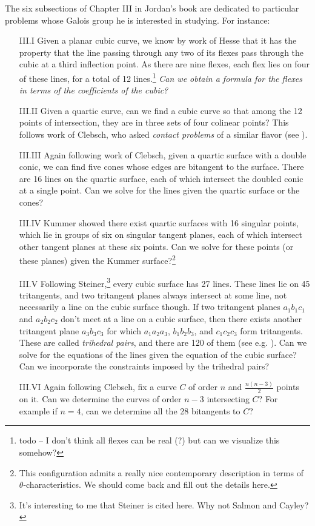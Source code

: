 \documentclass[11pt]{amsart}
\begin{document}
The six subsections of Chapter III in Jordan's book are dedicated to particular problems whose Galois group he is interested in studying. For instance:
\begin{itemize}
    \item[III.I] Given a planar cubic curve, we know by work of Hesse that it has the property that the line passing through any two of its flexes pass through the cubic at a third inflection point. As there are nine flexes, each flex lies on four of these lines, for a total of 12 lines.\footnote{todo -- I don't think all flexes can be real (?) but can we visualize this somehow?} \emph{Can we obtain a formula for the flexes in terms of the coefficients of the cubic?}

    \item[III.II] Given a quartic curve, can we find a cubic curve so that among the 12 points of intersection, they are in three sets of four colinear points? This follows work of Clebsch, who asked \textit{contact problems} of a similar flavor (see \cite[(429)]{Jordan}).

    \item[III.III] Again following work of Clebsch, given a quartic surface with a double conic, we can find five cones whose edges are bitangent to the surface. There are 16 lines on the quartic surface, each of which intersect the doubled conic at a single point. Can we solve for the lines given the quartic surface or the cones?
    
    \item[III.IV] Kummer showed there exist quartic surfaces with 16 singular points, which lie in groups of six on singular tangent planes, each of which intersect other tangent planes at these six points. Can we solve for these points (or these planes) given the Kummer surface?\footnote{This configuration admits a really nice contemporary description in terms of $\theta$-characteristics. We should come back and fill out the details here.}

    \item[III.V] Following Steiner,\footnote{It's interesting to me that Steiner is cited here. Why not Salmon and Cayley?} every cubic surface has 27 lines. These lines lie on 45 tritangents, and two tritangent planes always intersect at some line, not necessarily a line on the cubic surface though. If two tritangent planes $a_1b_1c_1$ and $a_2b_2c_2$ don't meet at a line on a cubic surface, then there exists another tritangent plane $a_3b_3c_3$ for which $a_1a_2a_3$, $b_1b_2b_3$, and $c_1c_2c_3$ form tritangents. These are called \textit{trihedral pairs}, and there are 120 of them (see e.g. \cite[p.~112]{Hunt}). Can we solve for the equations of the lines given the equation of the cubic surface? Can we incorporate the constraints imposed by the trihedral pairs?

    \item[III.VI] Again following Clebsch, fix a curve $C$ of order $n$ and $\frac{n(n-3)}{2}$ points on it. Can we determine the curves of order $n-3$ intersecting $C$? For example if $n=4$, can we determine all the 28 bitangents to $C$?
\end{itemize}
\end{document}
